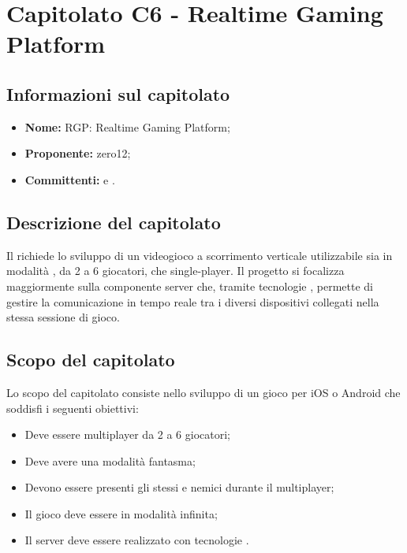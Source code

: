 \section{Capitolato C6 - Realtime Gaming Platform}
\label{C6}
\subsection{Informazioni sul capitolato}
\begin{itemize}
	\item \textbf{Nome:} RGP: Realtime Gaming Platform;
	\item \textbf{Proponente:} zero12;
	\item \textbf{Committenti:} \VT{} e \CR{}.
\end{itemize}

\subsection{Descrizione del capitolato}
Il  richiede lo sviluppo di un videogioco a scorrimento verticale utilizzabile sia in modalità , da 2 a 6 giocatori, che single-player. Il progetto si focalizza maggiormente sulla componente server che, tramite tecnologie , permette di gestire la comunicazione in tempo reale tra i diversi dispositivi collegati nella stessa sessione di gioco.

\subsection{Scopo del capitolato}
Lo scopo del capitolato consiste nello sviluppo di un gioco per iOS o Android che soddisfi i seguenti obiettivi:
\begin{itemize}
	\item Deve essere multiplayer da 2 a 6 giocatori;
	\item Deve avere una modalità fantasma;
	\item Devono essere presenti gli stessi  e nemici durante il multiplayer;
	\item Il gioco deve essere in modalità infinita;
	\item Il server deve essere realizzato con tecnologie .
\end{itemize}

